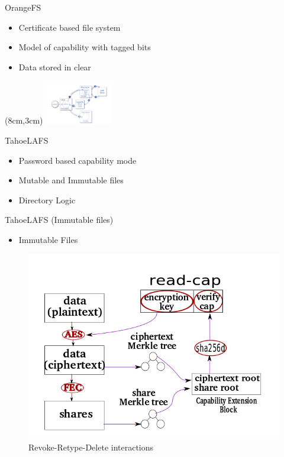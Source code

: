 \documentclass[xcolor=table]{beamer}
\begin{document}
\begin{frame}{OrangeFS}
    \begin{itemize}
    \vfill
    \item Certificate based file system
    \vfill
    \item Model of capability with tagged bits
    \vfill
    \item Data stored in clear
    \vfill
    \end{itemize}
    \begin{textblock*}{4cm}(8cm,3cm)
        \includegraphics[width=3cm]{img/orange.png}
    \end{textblock*}
\end{frame}

\begin{frame}{TahoeLAFS}
    \begin{itemize}
    \vfill
    \item Password based capability mode
    \vfill
    \item Mutable and Immutable files
    \vfill
    \item Directory Logic
    \vfill
    \end{itemize}
\end{frame}

\begin{frame}{TahoeLAFS (Immutable files)}
    \vfill
    \begin{itemize}
    \item Immutable Files
    \end{itemize}
    \vfill
    \begin{figure}
		  \includegraphics[scale=0.5]{img/immutable.png}
		  \caption{Revoke-Retype-Delete interactions}
    \end{figure}
    \vfill
\end{frame}
\end{document}
